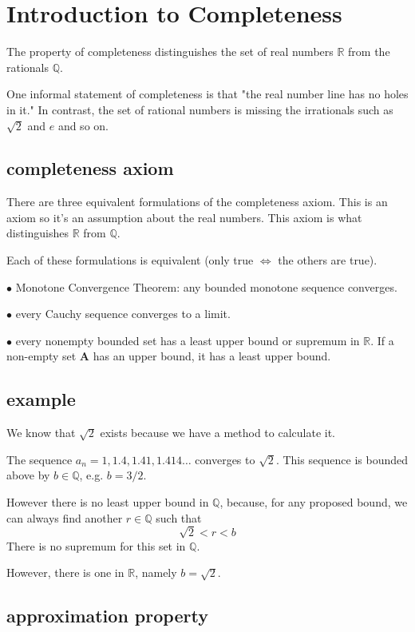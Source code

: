 \documentclass[11pt, oneside]{article}
\begin{document}
\section{Introduction to Completeness}

The property of completeness distinguishes the set of real numbers $\mathbb{R}$ from the rationals  $\mathbb{Q}$.

One informal statement of completeness is that "the real number line has no holes in it."  In contrast, the set of rational numbers is missing the irrationals such as $\sqrt{2}$ and $e$ and so on.

\subsection*{completeness axiom}

There are three equivalent formulations of the completeness axiom.  This is an axiom so it's an assumption about the real numbers.  This axiom is what distinguishes $\mathbb{R}$ from $\mathbb{Q}$.  

Each of these formulations is equivalent (only true $\iff$ the others are true).

$\bullet$  Monotone Convergence Theorem:  any bounded monotone sequence converges.

$\bullet$  every Cauchy sequence converges to a limit.

$\bullet$  every nonempty bounded set has a least upper bound or supremum in $\mathbb{R}$.  If a non-empty set $\mathbf{A}$ has an upper bound, it has a least upper bound.

\subsection*{example}

We know that $\sqrt{2}$ exists because we have a method to calculate it.

The sequence $a_n = 1, 1.4, 1.41, 1.414 \dots$ converges to $\sqrt{2}$.  This sequence is bounded above by $b \in \mathbb{Q}$, e.g. $b = 3/2$.  

However there is no least upper bound in $\mathbb{Q}$, because, for any proposed bound, we can always find another $r \in \mathbb{Q}$ such that
\[ \sqrt{2} < r < b \]
There is no supremum for this set in $\mathbb{Q}$.

However, there is one in $\mathbb{R}$, namely $b = \sqrt{2}$.

\subsection*{approximation property}
\end{document}
